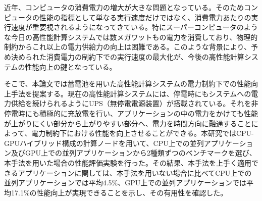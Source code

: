 近年、コンピュータの消費電力の増大が大きな問題となっている。そのためコンピュータの性能の指標として単なる実行速度だけではなく、消費電力あたりの実行速度が重要視されるようになってきている。特にスーパーコンピュータのような今日の高性能計算システムでは数メガワットもの電力を消費しており、物理的制約からこれ以上の電力供給力の向上は困難である。このような背景により、予め決められた消費電力の制約下での実行速度の最大化が、今後の高性能計算システムの性能向上の鍵となっている。

そこで、本論文では蓄電池を用いた高性能計算システムの電力制約下での性能向上手法を提案する。現在の高性能計算システムには、停電時にもシステムへの電力供給を続けられるようにUPS（無停電電源装置）が搭載されている。それを非停電時にも積極的に充放電を行い、アプリケーションの中の電力をかけても性能が上がりにくい部分から上がりやすい部分へ、電力を時間方向に融通することによって、電力制約下における性能を向上させることができる。本研究ではCPU-GPUハイブリッド構成の計算ノードを用いて、CPU上での並列アプリケーション及びGPU上での並列アプリケーションから2種類ずつのベンチマークを選び、本手法を用いた場合の性能評価実験を行った。その結果、本手法を上手く適用できるアプリケーションに関しては、本手法を用いない場合に比べてCPU上での並列アプリケーションでは平均4.5\%、GPU上での並列アプリケーションでは平均17.1\%の性能向上が実現できることを示し、その有用性を確認した。
